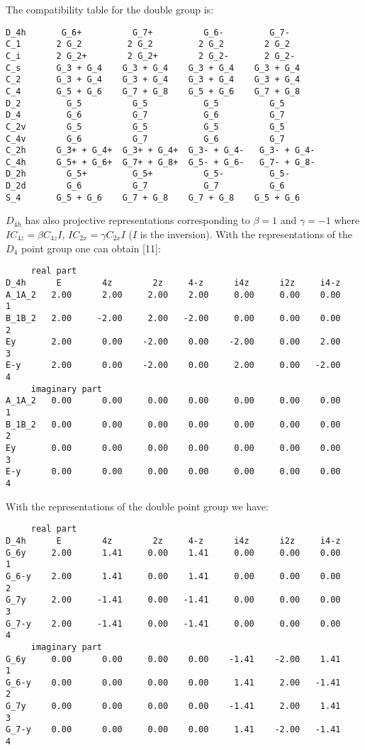 \documentclass[12pt,a4paper]{article}
\begin{document}
The compatibility table for the double group is:
\begin{verbatim}
D_4h       G_6+          G_7+          G_6-         G_7-
C_1       2 G_2         2 G_2         2 G_2        2 G_2
C_i       2 G_2+        2 G_2+        2 G_2-       2 G_2-
C_s       G_3 + G_4    G_3 + G_4    G_3 + G_4    G_3 + G_4
C_2       G_3 + G_4    G_3 + G_4    G_3 + G_4    G_3 + G_4
C_4       G_5 + G_6    G_7 + G_8    G_5 + G_6    G_7 + G_8
D_2         G_5          G_5           G_5          G_5
D_4         G_6          G_7           G_6          G_7
C_2v        G_5          G_5           G_5          G_5
C_4v        G_6          G_7           G_6          G_7
C_2h      G_3+ + G_4+  G_3+ + G_4+  G_3- + G_4-   G_3- + G_4-
C_4h      G_5+ + G_6+  G_7+ + G_8+  G_5- + G_6-   G_7- + G_8-
D_2h        G_5+         G_5+          G_5-         G_5-
D_2d        G_6          G_7           G_7          G_6
S_4       G_5 + G_6    G_7 + G_8    G_7 + G_8    G_5 + G_6
\end{verbatim}
$D_{4h}$ has also projective representations corresponding to
$\beta=1$ and $\gamma=-1$ where $IC_{4z} = \beta C_{4z} I$, 
$IC_{2x} = \gamma C_{2x} I$ ($I$ is the inversion).
With the representations of the $D_4$ point group one can obtain [11]:
\begin{verbatim}
     real part
D_4h      E        4z        2z     4-z      i4z      i2z     i4-z
A_1A_2   2.00      2.00     2.00    2.00     0.00     0.00    0.00    1
B_1B_2   2.00     -2.00     2.00   -2.00     0.00     0.00    0.00    2
Ey       2.00      0.00    -2.00    0.00    -2.00     0.00    2.00    3
E-y      2.00      0.00    -2.00    0.00     2.00     0.00   -2.00    4
     imaginary part
A_1A_2   0.00      0.00     0.00    0.00     0.00     0.00    0.00    1
B_1B_2   0.00      0.00     0.00    0.00     0.00     0.00    0.00    2
Ey       0.00      0.00     0.00    0.00     0.00     0.00    0.00    3
E-y      0.00      0.00     0.00    0.00     0.00     0.00    0.00    4
\end{verbatim}
With the representations of the double point group we have:
\begin{verbatim}
     real part
D_4h      E        4z        2z     4-z      i4z      i2z     i4-z
G_6y     2.00      1.41     0.00    1.41     0.00     0.00    0.00    1
G_6-y    2.00      1.41     0.00    1.41     0.00     0.00    0.00    2
G_7y     2.00     -1.41     0.00   -1.41     0.00     0.00    0.00    3
G_7-y    2.00     -1.41     0.00   -1.41     0.00     0.00    0.00    4
     imaginary part
G_6y     0.00      0.00     0.00    0.00    -1.41    -2.00    1.41    1
G_6-y    0.00      0.00     0.00    0.00     1.41     2.00   -1.41    2
G_7y     0.00      0.00     0.00    0.00    -1.41     2.00    1.41    3
G_7-y    0.00      0.00     0.00    0.00     1.41    -2.00   -1.41    4
\end{verbatim}
\end{document}

